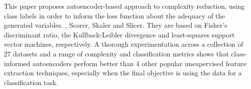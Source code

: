     This paper proposes  autoencoder-based approach to complexity reduction, using class labels in order to inform the loss function about the adequacy of the generated variables. , Scorer, Skaler and Slicer. They are based on Fisher's discriminant ratio, the Kullback-Leibler divergence and least-squares support vector machines, respectively.  A thorough experimentation across a collection of 27 datasets and a range of complexity and classification metrics shows that class-informed autoencoders perform better than 4 other popular unsupervised feature extraction techniques, especially when the final objective is using the data for a classification task.








%

